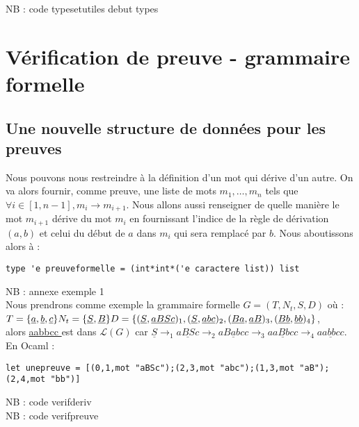 \documentclass[a4paper,12pt]{article}
\begin{document}
{\color{gray} NB : code typesetutiles debut types}\\

\section{Vérification de preuve - grammaire formelle}

\subsection{Une nouvelle structure de données pour les preuves}

Nous pouvons nous restreindre à la définition d'un mot qui dérive d'un autre.
On va alors fournir, comme preuve, une liste de mots $m_1, \dots, m_n$ tels que $\forall i\in [1,n-1], m_i \rightarrow m_{i+1}$. 
Nous allons aussi renseigner de quelle manière le mot $m_{i+1}$ dérive du mot $m_i$ en fournissant l'indice de la règle de dérivation $(a,b)$ et celui du début de $a$ dans $m_i$ qui sera remplacé par $b$.
Nous aboutissons alors à :
{\color{DarkBlue}\begin{verbatim}
type 'e preuveformelle = (int*int*('e caractere list)) list
\end{verbatim}}

{\color{gray} NB : annexe exemple 1}\\
Nous prendrons comme exemple la grammaire formelle $G = (T,N_t,S,D)$ où :\\
$
T = \{\underline{ a },\underline{ b },\underline{ c }\}\\
N_t = \{\underline{ S },\underline{ B }\}\\
D = \{(\underline{ S },\underline{ aBSc })_1,(\underline{ S },\underline{ abc })_2,(\underline{ Ba },\underline{ aB })_3,(\underline{ Bb },\underline{ bb })_4\}
$,\\
alors \underline{ aabbcc } est dans $\mathcal{L}(G)$ car $\underline{ S } \rightarrow_1 \underline{ aBSc } \rightarrow_2 \underline{ aBabcc } \rightarrow_3 \underline{ aaBbcc } \rightarrow_4 \underline{ aabbcc }$.\\
En Ocaml :
{\color{DarkBlue}\begin{verbatim}
let unepreuve = [(0,1,mot "aBSc");(2,3,mot "abc");(1,3,mot "aB");(2,4,mot "bb")]
\end{verbatim}}
{\color{gray} NB : code verifderiv}\\

{\color{gray} NB : code verifpreuve}\\
\end{document}
